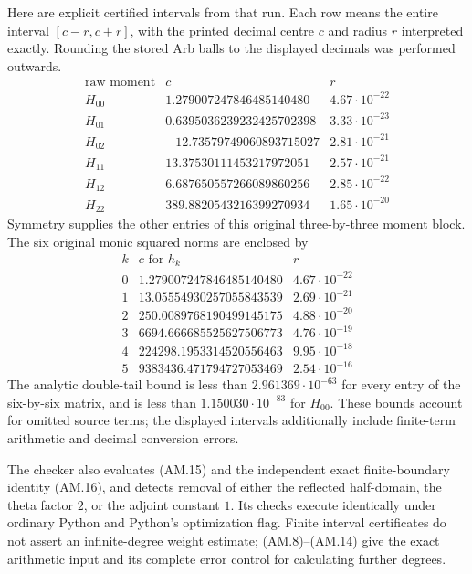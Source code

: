 Here are explicit certified intervals from that run.  Each row
means the entire interval \([c-r,c+r]\), with the printed decimal
centre \(c\) and radius \(r\) interpreted exactly.  Rounding the
stored Arb balls to the displayed decimals was performed outwards.
\[
\begin{array}{c|r|l}
 \text{raw moment}&c&r\\\hline
 H_{00}&1.279007247846485140480&4.67\cdot10^{-22}\\
 H_{01}&0.6395036239232425702398&3.33\cdot10^{-23}\\
 H_{02}&-12.73579749060893715027&2.81\cdot10^{-21}\\
 H_{11}&13.37530111453217972051&2.57\cdot10^{-21}\\
 H_{12}&6.687650557266089860256&2.85\cdot10^{-22}\\
 H_{22}&389.8820543216399270934&1.65\cdot10^{-20}
\end{array}
\]
Symmetry supplies the other entries of this original three-by-three
moment block.  The six original monic squared norms are enclosed by
\[
\begin{array}{c|r|l}
 k&c\text{ for }h_k&r\\\hline
 0&1.279007247846485140480&4.67\cdot10^{-22}\\
 1&13.05554930257055843539&2.69\cdot10^{-21}\\
 2&250.0089768190499145175&4.88\cdot10^{-20}\\
 3&6694.666685525627506773&4.76\cdot10^{-19}\\
 4&224298.1953314520556463&9.95\cdot10^{-18}\\
 5&9383436.471794727053469&2.54\cdot10^{-16}
\end{array}
\]
The analytic double-tail bound is less than
\(2.961369\cdot10^{-63}\) for every entry of the six-by-six
matrix, and is less than \(1.150030\cdot10^{-83}\) for \(H_{00}\).
These bounds account for omitted source terms; the displayed
intervals additionally include finite-term arithmetic and decimal
conversion errors.

The checker also evaluates (AM.15) and the independent exact
finite-boundary identity (AM.16), and detects removal of either
the reflected half-domain, the theta factor \(2\), or the
adjoint constant \(1\).  Its checks execute identically under
ordinary Python and Python's optimization flag.  Finite interval
certificates do not assert an infinite-degree weight estimate;
(AM.8)--(AM.14) give the exact arithmetic input and its complete
error control for calculating further degrees.
